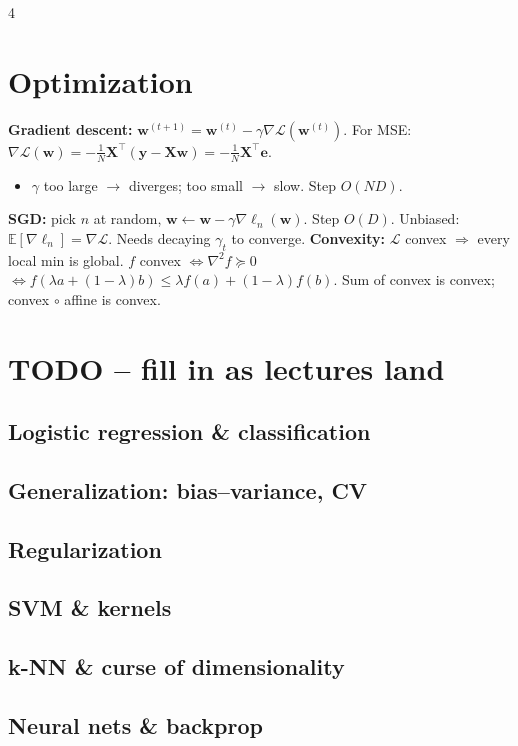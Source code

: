 \documentclass[a4paper,8pt,landscape]{extarticle}
\newcommand{\Lw}{\mathcal{L}(\bm{w})}
\newcommand{\w}{\bm{w}}
\begin{document}
\begin{multicols*}{4}
\section*{Optimization}
\textbf{Gradient descent:} $\w^{(t+1)}=\w^{(t)}-\gamma\nabla\mathcal{L}(\w^{(t)})$.
For MSE: $\nabla\Lw=-\frac1N\bm{X}^\top(\bm{y}-\bm{X}\w)=-\frac1N\bm{X}^\top\bm{e}$.
\begin{itemize}
\item $\gamma$ too large $\to$ diverges; too small $\to$ slow. Step $O(ND)$.
\end{itemize}
\textbf{SGD:} pick $n$ at random, $\w \leftarrow \w-\gamma\nabla\ell_n(\w)$. Step $O(D)$.
Unbiased: $\mathbb{E}[\nabla\ell_n]=\nabla\mathcal{L}$. Needs decaying $\gamma_t$ to converge.
\textbf{Convexity:} $\mathcal{L}$ convex $\Rightarrow$ every local min is global.
$f$ convex $\iff \nabla^2 f\succeq 0$ $\iff f(\lambda a+(1-\lambda)b)\le\lambda f(a)+(1-\lambda)f(b)$.
Sum of convex is convex; convex $\circ$ affine is convex.

\section*{TODO -- fill in as lectures land}
\subsection*{Logistic regression \& classification}
\subsection*{Generalization: bias--variance, CV}
\subsection*{Regularization}
\subsection*{SVM \& kernels}
\subsection*{k-NN \& curse of dimensionality}
\subsection*{Neural nets \& backprop}

\end{multicols*}
\end{document}
